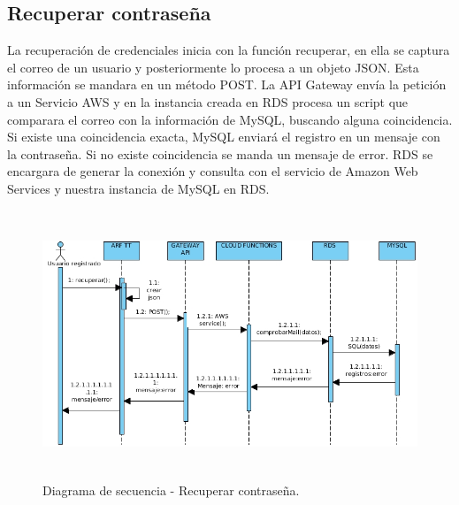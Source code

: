 \subsection{Recuperar contraseña}\par
La recuperación de credenciales inicia con la función recuperar, en ella se captura el correo de un usuario y posteriormente lo procesa a un objeto JSON. Esta información se mandara en un método POST. La API Gateway envía la petición a un Servicio AWS y en la instancia creada en RDS procesa un script que comparara el correo con la  información de MySQL, buscando alguna coincidencia. Si existe una coincidencia exacta, MySQL enviará el registro en un mensaje con la contraseña. Si no existe coincidencia se manda un mensaje de error. RDS se encargara de generar la conexión y consulta con el servicio de Amazon Web Services y nuestra instancia de MySQL en RDS.
\begin{figure}[h!]
	\centering
	\includegraphics[width=14cm,height=8cm]{imagenes/analisis/DSrecuperarContra.jpg}
	\caption{Diagrama de secuencia - Recuperar contraseña.}
	\label{fig:analogo}
\end{figure} 
\newpage

